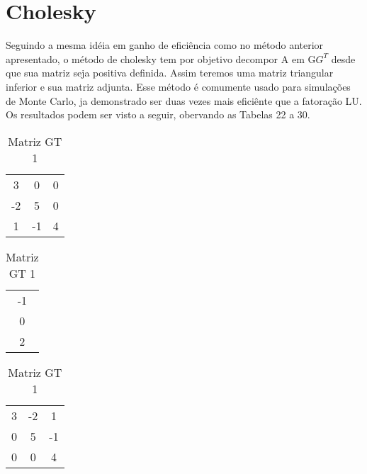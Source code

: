 \documentclass[12pt]{article}
\begin{document}
\section{Cholesky}

Seguindo a mesma idéia em ganho de eficiência como no método anterior apresentado, o método de cholesky tem por objetivo decompor A em G$G^{T}$ desde que sua matriz seja positiva definida. Assim teremos uma matriz triangular inferior e sua matriz adjunta. Esse método é comumente usado para simulações de Monte Carlo, ja demonstrado ser duas vezes mais eficiênte que a fatoração LU. Os resultados podem ser visto a seguir, obervando as Tabelas 22 a 30.

\begin{table}[!ht]
  \begin{minipage}[b]{.36\linewidth}

    \centering
    \begin{tabular}{|c c c|}
        3                 &         0                   &           0    \\
        -2          &         5                   &          0  \\
        1           &         -1           &          4    \\
    \end{tabular}
    \caption{Matriz G 1}
    \label{tab:dir}


  \end{minipage}\hfill
  \begin{minipage}[b]{.46\linewidth}

    \centering
    \begin{tabular}{|c|}
        -1\\
        0\\
        2\\
    \end{tabular}
    \caption{Resolução Matriz 1}
    \label{tab:dir}
  \end{minipage}\hfill
  \begin{minipage}[b]{.36\linewidth}

    \centering
    \begin{tabular}{|c c c|}
        3                 &         -2       &           1  \\
        0          &         5          &          -1       \\
        0           &         0               &          4  \\
    \end{tabular}
      \caption{Matriz GT 1}
    \label{tab:esq}
  \end{minipage}

\end{table}
\end{document}
